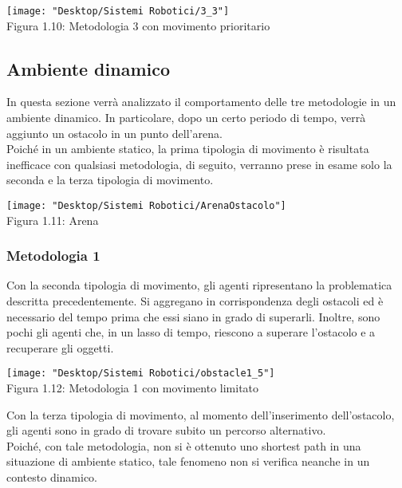 \documentclass[12pt,a4paper,openright,twoside]{report}
\begin{document}
\begin{center}  
	\texttt{[image: "Desktop/Sistemi Robotici/3\_3"]}
	\\Figura 1.10: Metodologia 3 con movimento prioritario
\end{center}

\subsection{Ambiente dinamico}

In questa sezione verrà analizzato il comportamento delle tre metodologie in un ambiente dinamico. In particolare, dopo un certo periodo di tempo, verrà aggiunto un ostacolo in un punto dell'arena.\\
Poiché in un ambiente statico, la prima tipologia di movimento è risultata inefficace con qualsiasi metodologia, di seguito, verranno prese in esame solo la seconda e la terza tipologia di movimento.\\

\begin{center}  
	\texttt{[image: "Desktop/Sistemi Robotici/ArenaOstacolo"]}
	\\Figura 1.11: Arena
\end{center}

\subsubsection{Metodologia 1}

Con la seconda tipologia di movimento, gli agenti ripresentano la problematica descritta precedentemente. Si aggregano in corrispondenza degli ostacoli ed è necessario del tempo prima che essi siano in grado di superarli. Inoltre, sono pochi gli agenti che, in un lasso di tempo, riescono a superare l'ostacolo e a recuperare gli oggetti.\\

\begin{center}  
	\texttt{[image: "Desktop/Sistemi Robotici/obstacle1\_5"]}
	\\Figura 1.12: Metodologia 1 con movimento limitato
\end{center}

Con la terza tipologia di movimento, al momento dell'inserimento dell'ostacolo, gli agenti sono in grado di trovare subito un percorso alternativo.\\
Poiché, con tale metodologia, non si è ottenuto uno shortest path in una situazione di ambiente statico, tale fenomeno non si verifica neanche in un contesto dinamico.
\end{document}
